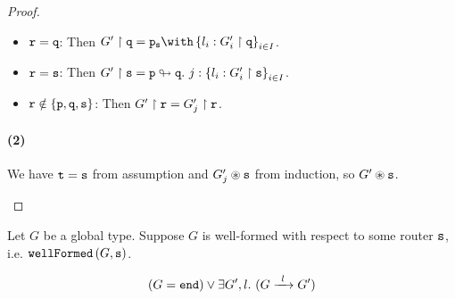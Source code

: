 \begin{proof}
\begin{itemize}
\begin{itemize}
\item ${\mathtt{r}} = {\mathtt{q}}$:
Then $\proj{G'}{q} = \tbraproxy{p}{s}{l_i: \proj{G'_i}{q}}{i \in I}$.

\item ${\mathtt{r}} = {\mathtt{s}}$:
Then ${G'} \upharpoonright {\mathtt{s}} = {\mathtt{p}} \looparrowright {\mathtt{q}}. ~ {j} : \left\{{l_i: {G'_i} \upharpoonright {\mathtt{s}}}\right\}_{i \in I}$.

\item ${\mathtt{r}} \notin \{ {\mathtt{p}}, {\mathtt{q}}, {\mathtt{s}} \}$:
Then ${G'} \upharpoonright {\mathtt{r}} = {G'_j} \upharpoonright {\mathtt{r}}$.

\end{itemize}

\paragraph{(2)}
We have ${\mathtt{t}} = {\mathtt{s}}$
from assumption and
${G'_j} \circledast {\mathtt{s}}$ from induction, so ${G'} \circledast {\mathtt{s}}$.

\end{itemize}

\end{proof}

\begin{lemma}
Let $G$ be a global type.
Suppose $G$ is well-formed with respect to some router ${\mathtt{s}}$,
i.e. $\textnormal{\texttt{wellFormed}}\left(G, {\mathtt{s}}\right)$.

\[
(G = \tend) \vee \exists G', l. ~ (\treduce{G}{G'}{l})
\]

\label{lem:progresswf}
\end{lemma}

